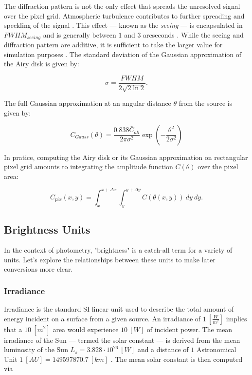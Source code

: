 The diffraction pattern is not the only effect that spreads the unresolved signal over the pixel grid. Atmospheric turbulence contributes to further spreading and speckling of the signal \cite{frueh2019notes}. This effect --- known as the \textit{seeing} --- is encapsulated in $FWHM_{seeing}$ and is generally between $1$ and $3$ arcseconds \cite{frueh2019notes}. While the seeing and diffraction pattern are additive, it is sufficient to take the larger value for simulation purposes \cite{frueh2019notes}. The standard deviation of the Gaussian approximation of the Airy disk is given by:

\begin{equation} \label{eq:airy_variance}
  \sigma = \frac{FWHM}{2 \sqrt{2 \ln{2}}}.
\end{equation}

The full Gaussian approximation at an angular distance $\theta$ from the source is given by:

\begin{equation} \label{eq:airy_gaussian}
  C_{Gauss}(\theta) = \frac{0.838 \bar{C}_{all}}{2 \pi \sigma^2} \exp\left( - \frac{\theta^2}{2 \sigma^2} \right)
\end{equation}

In pratice, computing the Airy disk or its Gaussian approximation on rectangular pixel grid amounts to integrating the amplitude function $C(\theta)$ over the pixel area:

\begin{equation}
  C_{pix}(x, y) = \int_{x}^{x + \Delta x} \int_{y}^{y + \Delta y}{C(\theta(x, y))} \: dy \: dy.
\end{equation}

\subsection{Brightness Units}

In the context of photometry, "brightness" is a catch-all term for a variety of units. Let's explore the relationships between these units to make later conversions more clear.

\subsubsection{Irradiance}

Irradiance is the standard SI linear unit used to describe the total amount of energy incident on a
surface from a given source. An irradiance of $1 \: \left[ \frac{W}{m^2} \right]$ implies that a $10
\: [m^2]$ area would experience $10 \: [W]$ of incident power. The mean irradiance of the Sun --- termed the solar constant --- is derived from the mean luminosity of the Sun $L_s = 3.828\cdot10^{26} \: [W]$ and a distance of $1$ Astronomical Unit $1 \: [AU] = 149597870.7 \: [km]$ \cite{frueh2019notes}. The mean solar constant is then computed via

